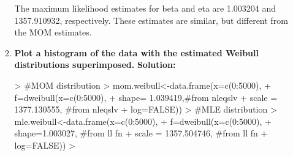 \documentclass{article}
\begin{document}
\begin{enumerate}
\begin{enumerate}
\begin{Schunk}
\end{Schunk}
The maximum likelihood estimates for beta and eta are 1.003204 and 1357.910932, respectively. These estimates are similar, but different from the MOM estimates.
\newline
  \item \textbf{Plot a histogram of the data with the estimated Weibull distributions superimposed.}
  \newline
  \textbf{Solution:}
  \newline
\begin{Schunk}
\begin{Sinput}
> #MOM distribution
> mom.weibull<-data.frame(x=c(0:5000), 
+                         f=dweibull(x=c(0:5000), 
+                         shape= 1.039419,#from nleqslv
+                         scale = 1377.130555, #from nleqslv
+                         log=FALSE))
> #MLE distribution
> mle.weibull<-data.frame(x=c(0:5000), 
+                         f=dweibull(x=c(0:5000), 
+                         shape=1.003027, #from ll fn
+                         scale = 1357.504746, #from ll fn
+                         log=FALSE))
> 
\end{Sinput}
\end{Schunk}


\end{enumerate}
\end{enumerate}
\end{document}
